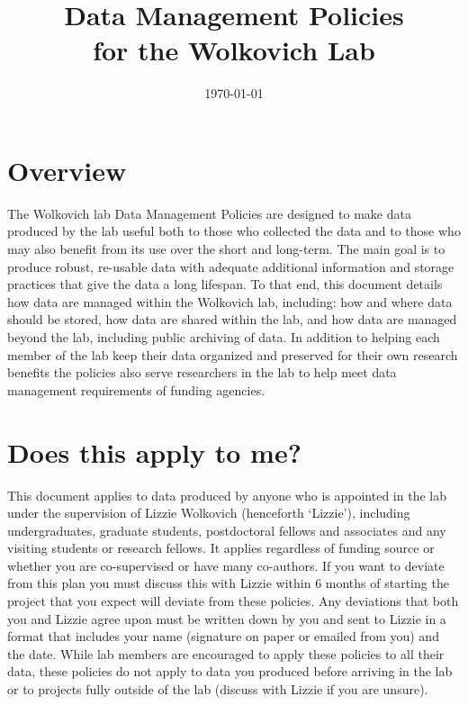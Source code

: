 \documentclass[11pt,a4paper,oneside]{article}
\begin{document}



\title{Data Management Policies\\ for the Wolkovich Lab}
\date{\today}
\maketitle
\tableofcontents



\section{Overview}
The Wolkovich lab Data Management Policies are designed to make data produced by the lab useful both to those who collected the data and to those who may also benefit from its use over the short and long-term. The main goal is to produce robust, re-usable data with adequate additional information and storage practices that give the data a long lifespan. To that end, this document details how data are managed within the Wolkovich lab, including: how and where data should be stored, how data are shared within the lab, and how data are managed beyond the lab, including public archiving of data. In addition to helping each member of the lab keep their data organized and preserved for their own research benefits the policies also serve researchers in the lab to help meet data management requirements of funding agencies.  

\section{Does this apply to me?}
This document applies to data produced by anyone who is appointed in the lab under the supervision of Lizzie Wolkovich (henceforth `Lizzie'), including undergraduates, graduate students, postdoctoral fellows and associates and any visiting students or research fellows. It applies regardless of funding source or whether you are co-supervised or have many co-authors. If you want to deviate from this plan you must discuss this with Lizzie within 6 months of starting the project that you expect will deviate from these policies. Any deviations that both you and Lizzie agree upon must be written down by you and sent to Lizzie in a format that includes your name (signature on paper or emailed from you) and the date. While lab members are encouraged to apply these policies to all their data, these policies do not apply to data you produced before arriving in the lab or to projects fully outside of the lab (discuss with Lizzie if you are unsure). 
\end{document}
